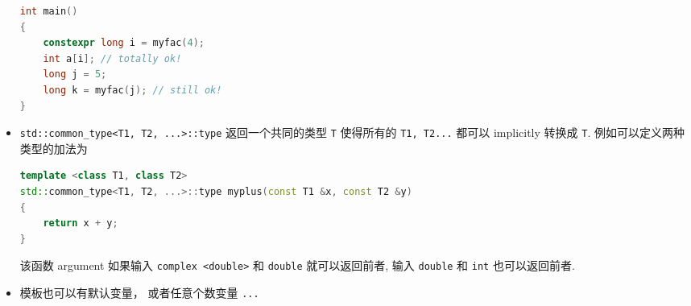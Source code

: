 \begin{itemize}
\begin{lstlisting}[language=cpp]
int main()
{
	constexpr long i = myfac(4);
	int a[i]; // totally ok!
	long j = 5;
	long k = myfac(j); // still ok!
}
\end{lstlisting}
\item \verb`std::common_type<T1, T2, ...>::type` 返回一个共同的类型 \verb`T` 使得所有的 \verb`T1, T2...` 都可以 implicitly 转换成 \verb`T`. 例如可以定义两种类型的加法为
\begin{lstlisting}[language=cpp]
template <class T1, class T2>
std::common_type<T1, T2, ...>::type myplus(const T1 &x, const T2 &y)
{
	return x + y;
}
\end{lstlisting}
该函数 argument 如果输入 \verb`complex <double>` 和 \verb`double` 就可以返回前者, 输入 \verb`double` 和 \verb`int` 也可以返回前者.
\item 模板也可以有默认变量， 或者任意个数变量 \verb|...|
\end{itemize}
